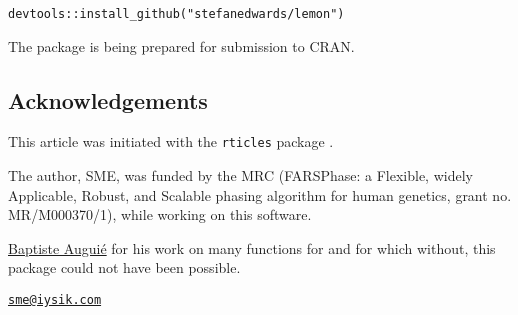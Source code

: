 \begin{verbatim}
devtools::install_github("stefanedwards/lemon")
\end{verbatim}

The package is being prepared for submission to CRAN.

\subsection{Acknowledgements}

This article was initiated with the \texttt{rticles} package
\citep{rticles}.

The author, SME, was funded by the MRC (FARSPhase: a Flexible, widely
Applicable, Robust, and Scalable phasing algorithm for human genetics,
grant no. MR/M000370/1), while working on this software.

\href{https://baptiste.github.io/}{Baptiste Augui\'{e}} for his work on
many functions for  and  for which
without, this package could not have been possible.



\address{%
Stefan McKinnon Edwards\\
The Roslin Insititute, University of Edinburgh\\
Easter Bush\\ Midlothian\\ EH25 9RG\\ Scotland, UK\\  ORCiD: 0000-0002-4628-8148 \\
}
\href{mailto:sme@iysik.com}{\nolinkurl{sme@iysik.com}}

